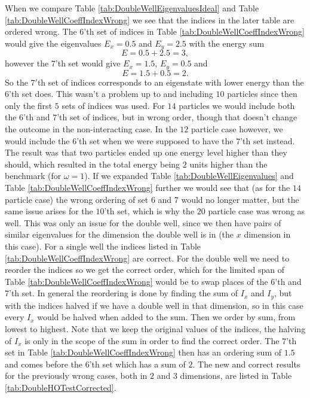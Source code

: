 \documentclass[../main.tex]{subfiles}
\begin{document}
When we compare Table \ref{tab:DoubleWellEigenvaluesIdeal} and Table \ref{tab:DoubleWellCoeffIndexWrong} we see that the indices in the later table are ordered wrong. The $6$'th set of indices in Table \ref{tab:DoubleWellCoeffIndexWrong} would give the eigenvalues $E_x = 0.5$ and $E_y = 2.5$ with the energy sum 
\begin{equation}
    E = 0.5 + 2.5 = 3,
\end{equation}
however the $7$'th set would give $E_x = 1.5$, $E_y = 0.5$ and 
\begin{equation}
    E = 1.5 + 0.5 = 2.
\end{equation}
So the $7'$th set of indices corresponds to an eigenstate with lower energy than the $6$'th set does. This wasn't a problem up to and including $10$ particles since then only the first $5$ sets of indices was used. For $14$ particles we would include both the $6$'th and $7$'th set of indices, but in wrong order, though that doesn't change the outcome in the non-interacting case. In the $12$ particle case however, we would include the $6$'th set when we were supposed to have the $7$'th set instead. The result was that two particles ended up one energy level higher than they should, which resulted in the total energy being $2$ units higher than the benchmark (for $\omega=1$). If we expanded Table \ref{tab:DoubleWellEigenvalues} and Table \ref{tab:DoubleWellCoeffIndexWrong} further we would see that (as for the $14$ particle case) the wrong ordering of set $6$ and $7$ would no longer matter, but the same issue arises for the $10$'th set, which is why the $20$ particle case was wrong as well. This was only an issue for the double well, since we then have pairs of similar eigenvalues for the dimension the double well is in (the $x$ dimension in this case). For a single well the indices listed in Table \ref{tab:DoubleWellCoeffIndexWrong} are correct. For the double well we need to reorder the indices so we get the correct order, which for the limited span of Table \ref{tab:DoubleWellCoeffIndexWrong} would be to swap places of the $6$'th and $7$'th set. In general the reordering is done by finding the sum of $I_x$ and $I_y$, but with the indices halved if we have a double well in that dimension, so in this case every $I_x$ would be halved when added to the sum. Then we order by sum, from lowest to highest. Note that we keep the original values of the indices, the halving of $I_x$ is only in the scope of the sum in order to find the correct order. The $7$'th set in Table \ref{tab:DoubleWellCoeffIndexWrong} then has an ordering sum of $1.5$ and comes before the $6$'th set which has a sum of $2$. The new and correct results for the previously wrong cases, both in $2$ and $3$ dimensions, are listed in Table \ref{tab:DoubleHOTestCorrected}.
\end{document}
